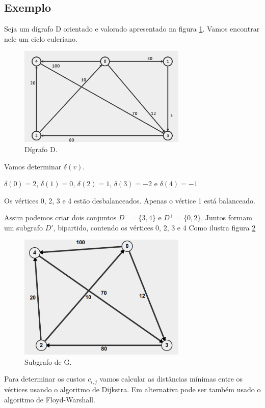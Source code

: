 \documentclass[a4paper, 12pt]{article}
\begin{document}
	\subsection{Exemplo}
	Seja um dígrafo D orientado e valorado apresentado na figura \ref{fig:grafoG}. Vamos encontrar nele um ciclo euleriano.
	\begin{figure}[H]
		\centering
		\includegraphics[width=8cm]{img/grafoG.png}
		\caption{Dígrafo D.}
		\label{fig:grafoG}
	\end{figure}
	
	Vamos determinar $\delta(v)$. 
	
	$\delta(0)=2$, $\delta(1)=0$, $\delta(2)=1$, $\delta(3)=-2$ e $\delta(4)=-1$
	
	Os vértices 0, 2, 3 e 4 estão desbalanceados. Apenas o vértice 1 está balanceado. 
	
	Assim podemos criar dois conjuntos $D^-=\{3,4\}$ e $D^+=\{0,2\}$. Juntos formam um subgrafo $D'$, bipartido, contendo os vértices 0, 2, 3 e 4 Como ilustra figura \ref{fig:subgrafoG}
	
	\begin{figure}[H]
		\centering
		\includegraphics[width=8cm]{img/subgrafoG.png}
		\caption{Subgrafo de G.}
		\label{fig:subgrafoG}
	\end{figure}


 Para determinar os custos $c_{i,j}$ vamos calcular as distâncias mínimas entre os vértices usando o algoritmo de Dijkstra. Em alternativa pode ser também usado o algoritmo de Floyd-Warshall.
\end{document}
